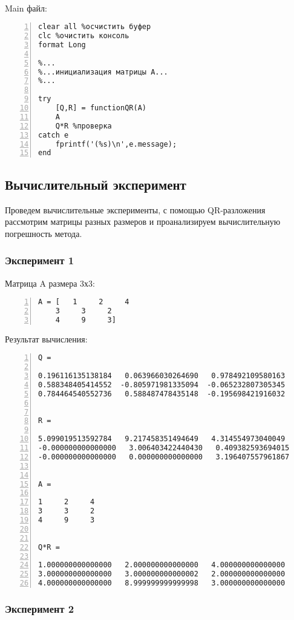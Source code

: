\documentclass[14pt, titlepage, a4paper]{extarticle} %
\begin{document}
	~\\
	Main файл:	
	\begin{Verbatim}[numbers=left,xleftmargin=0mm]
clear all %осчистить буфер
clc %очистить консоль
format Long

%...
%...инициализация матрицы А...
%...

try
    [Q,R] = functionQR(A)
    A	
    Q*R %проверка
catch e
    fprintf('(%s)\n',e.message);
end
	\end{Verbatim}
	\pagebreak
	\subsection*{Вычислительный эксперимент}
	
	Проведем вычислительные эксперименты, с помощью QR-разложения рассмотрим матрицы разных размеров и проанализируем вычислительную погрешность метода.
	 
	\subsubsection*{Эксперимент 1}

	Матрица A размера 3х3:
	\begin{Verbatim}[numbers=left,xleftmargin=0mm]
A = [   1     2     4
	3     3     2
	4     9     3]
	\end{Verbatim}
	Результат вычисления:
	\begin{Verbatim}[numbers=left,xleftmargin=0mm]
Q =

0.196116135138184   0.063966030264690   0.978492109580163
0.588348405414552  -0.805971981335094  -0.065232807305345
0.784464540552736   0.588487478435148  -0.195698421916032


R =

5.099019513592784   9.217458351494649   4.314554973040049
-0.000000000000000   3.006403422440430   0.409382593694015
-0.000000000000000   0.000000000000000   3.196407557961867


A =

1     2     4
3     3     2
4     9     3


Q*R =

1.000000000000000   2.000000000000000   4.000000000000000
3.000000000000000   3.000000000000002   2.000000000000000
4.000000000000000   8.999999999999998   3.000000000000000
	\end{Verbatim}
	
	\subsubsection*{Эксперимент 2}
	
\end{document}
